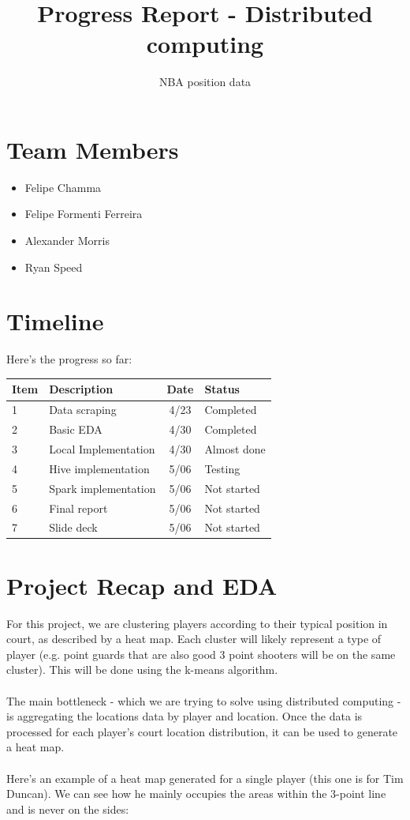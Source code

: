 \documentclass[11pt]{article}
\title{Progress Report - Distributed computing}
\author{NBA position data}
\date{}
\begin{document}
\maketitle

\section{Team Members}

\begin{itemize}
\item Felipe Chamma
\item Felipe Formenti Ferreira
\item Alexander Morris
\item Ryan Speed
\end{itemize}

\section{Timeline}
Here's the progress so far:


\begin{center}
  \begin{tabular}{ l l c l }
    Item & Description & Date & Status\\ \hline \hline
    1 & Data scraping & 4/23 & Completed\\ \hline
    2 & Basic EDA & 4/30 & Completed\\ \hline
    3 & Local Implementation & 4/30 & Almost done \\ \hline
    4 & Hive implementation & 5/06 & Testing \\ \hline
    5 & Spark implementation & 5/06 & Not started \\ \hline
    6 & Final report & 5/06 & Not started \\ \hline
    7 & Slide deck & 5/06 & Not started \\ \hline
    \hline
  \end{tabular}
\end{center}

\section{Project Recap and EDA}
For this project, we are clustering players according to their typical position in court, as described by a heat map. Each cluster will likely represent a type of player (e.g. point guards that are also good 3 point shooters will be on the same cluster). This will be done using the k-means algorithm.\\
\\The main bottleneck - which we are trying to solve using distributed computing - is aggregating the locations data by player and location. Once the data is processed for each player's court location distribution, it can be used to generate a heat map.\\
\\ Here's an example of a heat map generated for a single player (this one is for Tim Duncan). We can see how he mainly occupies the areas within the 3-point line and is never on the sides:\\
\end{document}
